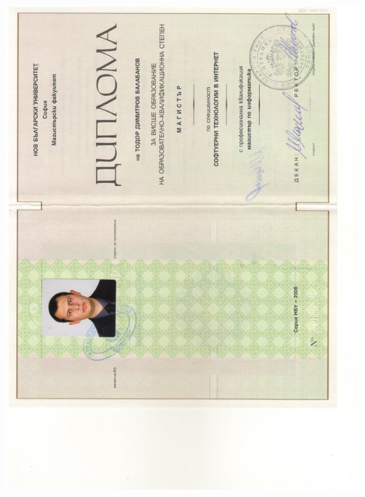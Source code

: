 \documentclass[english,a4paper]{europasscv}
\begin{document}
\includegraphics[width=\textwidth,height=\textheight,keepaspectratio]{DiplomaNBU2008_2}
\end{document}

